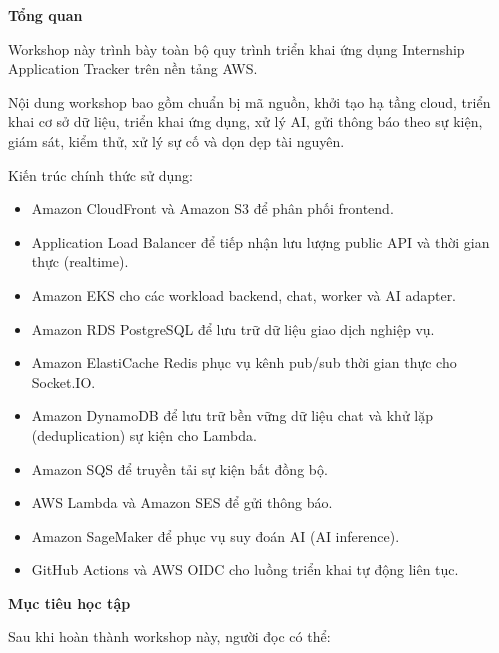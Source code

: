 \vspace{0.5em}\noindent\textbf{Tổng quan}\par

Workshop này trình bày toàn bộ quy trình triển khai ứng dụng Internship
Application Tracker trên nền tảng AWS.

Nội dung workshop bao gồm chuẩn bị mã nguồn, khởi tạo hạ tầng cloud,
triển khai cơ sở dữ liệu, triển khai ứng dụng, xử lý AI, gửi thông báo
theo sự kiện, giám sát, kiểm thử, xử lý sự cố và dọn dẹp tài nguyên.

Kiến trúc chính thức sử dụng:

\begin{itemize}
\tightlist
\item
  Amazon CloudFront và Amazon S3 để phân phối frontend.
\item
  Application Load Balancer để tiếp nhận lưu lượng public API và thời
  gian thực (realtime).
\item
  Amazon EKS cho các workload backend, chat, worker và AI adapter.
\item
  Amazon RDS PostgreSQL để lưu trữ dữ liệu giao dịch nghiệp vụ.
\item
  Amazon ElastiCache Redis phục vụ kênh pub/sub thời gian thực cho
  Socket.IO.
\item
  Amazon DynamoDB để lưu trữ bền vững dữ liệu chat và khử lặp
  (deduplication) sự kiện cho Lambda.
\item
  Amazon SQS để truyền tải sự kiện bất đồng bộ.
\item
  AWS Lambda và Amazon SES để gửi thông báo.
\item
  Amazon SageMaker để phục vụ suy đoán AI (AI inference).
\item
  GitHub Actions và AWS OIDC cho luồng triển khai tự động liên tục.
\end{itemize}

\vspace{0.5em}\noindent\textbf{Mục tiêu học tập}\par

Sau khi hoàn thành workshop này, người đọc có thể:

